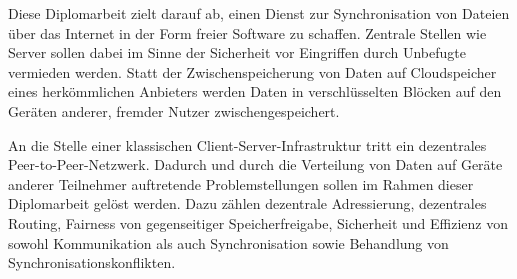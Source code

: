 Diese Diplomarbeit zielt darauf ab, einen Dienst zur Synchronisation von Dateien
über das Internet in der Form freier Software zu schaffen. Zentrale Stellen wie
Server sollen dabei im Sinne der Sicherheit vor Eingriffen durch Unbefugte
vermieden werden. Statt der Zwischenspeicherung von Daten auf Cloudspeicher
eines herkömmlichen Anbieters werden Daten in verschlüsselten Blöcken auf den
Geräten anderer, fremder Nutzer zwischengespeichert.

An die Stelle einer klassischen Client-Server-Infrastruktur tritt ein
dezentrales Peer-to-Peer-Netzwerk. Dadurch und durch die Verteilung von Daten
auf Geräte anderer Teilnehmer auftretende Problemstellungen sollen im Rahmen
dieser Diplomarbeit gelöst werden. Dazu zählen dezentrale Adressierung,
dezentrales Routing, Fairness von gegenseitiger Speicherfreigabe, Sicherheit
und Effizienz von sowohl Kommunikation als auch Synchronisation sowie Behandlung
von Synchronisationskonflikten.
